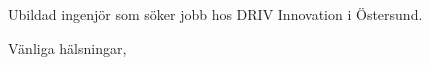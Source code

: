 \documentclass[11pt,a4paper,sans]{moderncv}        %
\begin{document}

\clearpage
\date{\today}
\opening{Ubildad ingenjör som söker jobb hos DRIV Innovation i Östersund.}
\closing{Vänliga hälsningar,}
\makelettertitle
\end{document}
